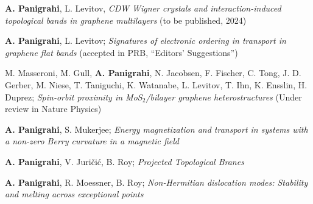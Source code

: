 

\begin{cventries}

  \cventry
    {} %
    {} %
    {} %
    {} %
    {
	  \begin{cvitems} %
	  	\item{\textbf{A. Panigrahi}, L. Levitov, \textit{CDW Wigner crystals and interaction-induced topological bands in graphene multilayers} (to be published, 2024)}
	  	\item{\textbf{A. Panigrahi}, L. Levitov; \textit{Signatures of electronic ordering in transport in graphene flat bands}
	  		 (accepted in PRB, ``Editors' Suggestions'')}
	  	\item{M. Masseroni, M. Gull, \textbf{A. Panigrahi}, N. Jacobsen, F. Fischer, C. Tong, J. D. Gerber, M. Niese, T. Taniguchi, K. Watanabe, L. Levitov, T. Ihn, K. Ensslin, H. Duprez; \textit{Spin-orbit proximity in MoS$_2$/bilayer graphene heterostructures}
	  		 (Under review in Nature Physics)}
	  	\item{\textbf{A. Panigrahi}, S. Mukerjee; \textit{Energy magnetization and transport in systems with a non-zero Berry curvature in a magnetic field}
	  		}
	  	\item{\textbf{A. Panigrahi}, V. Juri\v{c}i\'c, B. Roy; \textit{Projected Topological Branes}}
      	\item{\textbf{A. Panigrahi}, R. Moessner, B. Roy; \textit{Non-Hermitian dislocation modes: Stability and melting across exceptional points} }
      \end{cvitems}
    }


\end{cventries}
